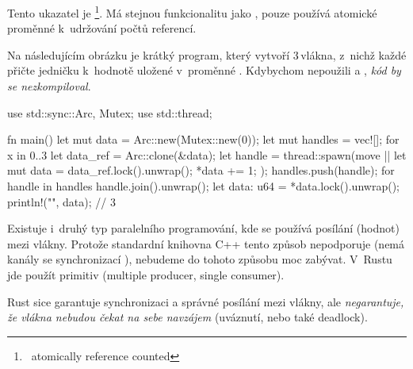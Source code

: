 \documentclass[main.tex]{subfiles}
\begin{document}
Tento ukazatel je \footnote{~atomically reference counted}. Má stejnou
funkcionalitu jako , pouze používá atomické proměnné k~udržování počtů
referencí. \cite[sekce\,16.3]{thebook}

Na následujícím obrázku je krátký program, který vytvoří 3\,vlákna, z~nichž každé přičte
jedničku k~hodnotě uložené v~proměnné . Kdybychom nepoužili  a
, \emph{kód by se nezkompiloval}.

\obrazek
\begin{rustcode}
    use std::sync::{Arc, Mutex};
    use std::thread;

    fn main() {
        let mut data = Arc::new(Mutex::new(0));
        let mut handles = vec![];
        for x in 0..3 {
            let data_ref = Arc::clone(&data);
            let handle = thread::spawn(move || {
                let mut data = data_ref.lock().unwrap();
                *data += 1;
            });
            handles.push(handle);
        }
        for handle in handles {
            handle.join().unwrap();
        }
        let data: u64 = *data.lock().unwrap();
        println!("{}", data); // 3
    }
\end{rustcode}


Existuje i~druhý typ paralelního programování, kde se používá posílání  (hodnot)
mezi vlákny. Protože standardní knihovna C++ tento způsob nepodporuje (nemá kanály se
synchronizací \cite{cppreference}), nebudeme do tohoto způsobu moc zabývat. V~Rustu jde
použít primitiv  (multiple producer, single consumer).
\cite[sekce\,16.2]{thebook}


Rust sice garantuje synchronizaci a správné posílání mezi vlákny, ale \emph{negarantuje,
    že vlákna nebudou čekat na sebe navzájem
} (uváznutí, nebo také deadlock). \cite[sekce\,16.3]{thebook}
\end{document}
